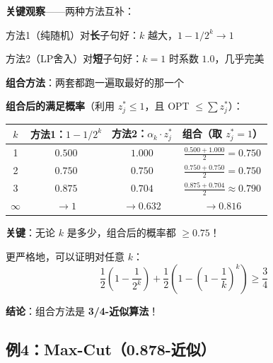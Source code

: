 \documentclass[12pt, a4paper]{ctexart}
\begin{document}
\begin{blackboard}[组合两种方法：3/4 近似]

\textbf{关键观察}——两种方法互补：

方法1（纯随机）对\textbf{长}子句好：$k$ 越大，$1 - 1/2^k \to 1$

方法2（LP舍入）对\textbf{短}子句好：$k=1$ 时系数 $1.0$，几乎完美

\textbf{组合方法}：两套都跑一遍取最好的那一个 

\textbf{组合后的满足概率}（利用 $z_j^* \leq 1$，且 OPT $\leq \sum z_j^*$）：

\begin{center}
\begin{tabular}{c|cc|c}
$k$ & 方法1：$1-1/2^k$ & 方法2：$\alpha_k \cdot z_j^*$ & 组合（取 $z_j^*=1$） \\
\hline
1 & $0.500$ & $1.000$ & $\frac{0.500 + 1.000}{2} = \mathbf{0.750}$ \\
2 & $0.750$ & $0.750$ & $\frac{0.750 + 0.750}{2} = \mathbf{0.750}$ \\
3 & $0.875$ & $0.704$ & $\frac{0.875 + 0.704}{2} \approx 0.790$ \\
$\infty$ & $\to 1$ & $\to 0.632$ & $\to 0.816$
\end{tabular}
\end{center}

\textbf{关键}：无论 $k$ 是多少，组合后的概率都 $\geq 0.75$！

更严格地，可以证明对任意 $k$：
\[
\frac{1}{2}\left(1 - \frac{1}{2^k}\right) + \frac{1}{2}\left(1 - \left(1 - \frac{1}{k}\right)^k\right) \geq \frac{3}{4}
\]

\textbf{结论}：组合方法是 \textbf{3/4-近似算法}！

\end{blackboard}

\subsection{例4：Max-Cut（0.878-近似）}
\end{document}
